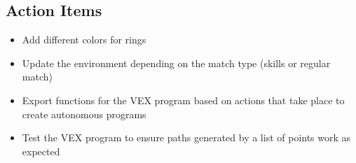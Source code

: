 \subsection{Action Items}
\begin{itemize}
    \item Add different colors for rings
    \item Update the environment depending on the match type (skills or regular match)
    \item Export functions for the VEX program based on actions that take place to create autonomous programs
    \item Test the VEX program to ensure paths generated by a list of points work as expected
\end{itemize}